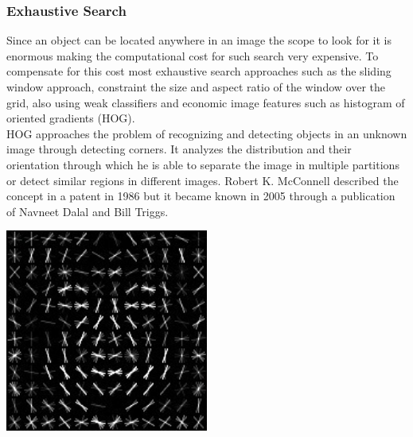 \subsubsection{Exhaustive Search}
Since an object can be located anywhere in an image the scope to look for it is enormous making the computational cost for such search very
expensive. To compensate for this cost most exhaustive search approaches such as the sliding window approach, constraint the size and aspect
ratio of the window over the grid, also using weak classifiers and economic image features such as histogram of oriented gradients
(HOG).\cite{selectivesearch} \\
HOG approaches the problem of recognizing and detecting objects in an unknown image through detecting corners. It analyzes the distribution and their
orientation through which he is able to separate the image in multiple partitions or detect similar regions in different images.
Robert K. McConnell described the concept in a patent in 1986 but it became known in 2005 through a publication of Navneet Dalal and Bill
Triggs.\cite{wiki_hog}
\vspace{0.5cm}
\begin{center}
    \includegraphics[width=0.5\textwidth]{images/Dlib_Learned-HOG-Detector.jpg} \cite{wiki_hog}
\end{center}

